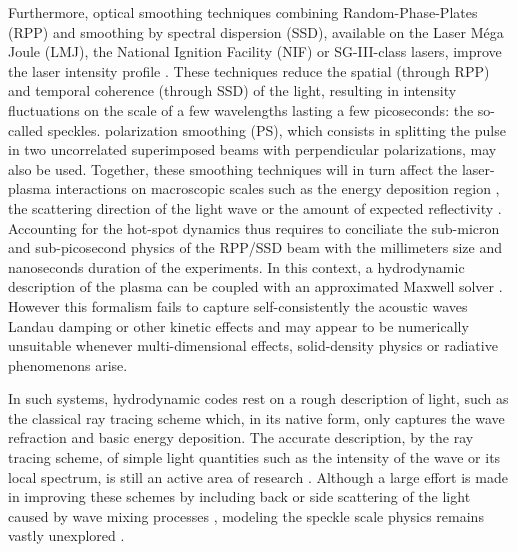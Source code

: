 \documentclass[%
 reprint,
 amsmath,amssymb,
 aps,
]{revtex4-1}
\begin{document}
Furthermore, optical smoothing techniques combining  Random-Phase-Plates (RPP) and  smoothing by spectral dispersion (SSD), available on the Laser M\'ega Joule (LMJ), the National Ignition Facility (NIF) or SG-III-class lasers, improve the laser intensity profile \cite{Kato_1984,Skupski_1989}.
These techniques reduce  the spatial (through RPP) and temporal coherence (through SSD) of the  light,  resulting in intensity fluctuations on the scale of a few wavelengths lasting a few picoseconds: the so-called speckles. polarization smoothing (PS), which consists in splitting the pulse in two uncorrelated superimposed beams with perpendicular polarizations, may also be used. 
Together, these smoothing techniques will in turn affect the laser-plasma interactions on macroscopic scales such as the energy deposition region  \cite[]{POP_Delamater_1996,Huser_2009}, the scattering direction  of the light wave \cite{Epstein_1986,PRL_Moody_96,POP_Debayle_2018,POP_Duluc_2019,Yin_2019,POP_Huller_2020} or the amount of expected reflectivity \cite[]{POP_Laffite_2010,POP_Masson_2016,Glize_2017,Winjum_2019}. Accounting for the hot-spot dynamics thus requires to conciliate the sub-micron and sub-picosecond physics of the RPP/SSD beam with the millimeters size and nanoseconds duration of the experiments. 
In this context, a hydrodynamic description of the plasma can be coupled with an approximated Maxwell solver  \cite{Berger_1995,Still_2006,Loiseau_2006, Huller_2006}. However this formalism fails to capture self-consistently the acoustic waves Landau damping or other kinetic effects and may appear to be numerically unsuitable whenever  multi-dimensional effects,  solid-density physics or radiative phenomenons arise.

In such systems, hydrodynamic codes rest on a rough description of light,  such as the classical ray tracing scheme \cite[]{Hydra,Lared-H,POP_Zhang_2014,Lefebvre_2018} which, in its native form, only captures the wave refraction and basic energy deposition.
The accurate description, by the ray tracing scheme,  of simple  light quantities  such as the intensity  of the wave or its local spectrum, is still an active area of research  \cite{Egorchenkov_2001, Colaitis_2014, Strozzi_2017,POP_Colaitis_2019}.
Although a large effort is made in improving these schemes by including back or side scattering of the light caused by wave mixing processes \cite[]{Strozzi_2017,POP_Debayle_2019},  
modeling the speckle scale physics  remains vastly unexplored \cite[]{PRL_Hinkel_1996,POP_Grech_2006,PRL_Grech_2009,PRL_Rousseaux_2016}.
 
\end{document}
